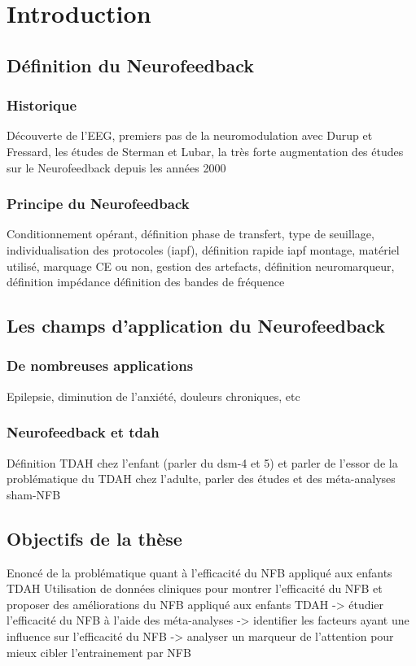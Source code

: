 \chapter{Introduction}


\section{Définition du Neurofeedback}

\subsection{Historique}
Découverte de l’EEG, premiers pas de la neuromodulation avec Durup 
et Fressard, les études de Sterman et Lubar, la très forte augmentation des études sur le Neurofeedback depuis 
les années 2000

\subsection{Principe du Neurofeedback}
Conditionnement opérant, définition phase de transfert, type de seuillage, individualisation des protocoles (iapf), 
définition rapide iapf
montage, matériel utilisé, marquage CE ou non, gestion des artefacts, définition neuromarqueur, définition impédance
définition des bandes de fréquence

\section{Les champs d'application du Neurofeedback}

\subsection{De nombreuses applications}
Epilepsie, diminution de l’anxiété, douleurs chroniques, etc

\subsection{Neurofeedback et \gls{tdah}}
Définition TDAH chez l’enfant (parler du dsm-4 et 5) et parler de l’essor de la problématique du TDAH chez l’adulte, parler des études et des méta-analyses
sham-NFB

\section{Objectifs de la thèse}
Enoncé de la problématique quant à l’efficacité du NFB appliqué aux enfants TDAH
Utilisation de données cliniques pour montrer l'efficacité du NFB et proposer des améliorations du NFB appliqué aux enfants TDAH
-> étudier l'efficacité du NFB à l'aide des méta-analyses
-> identifier les facteurs ayant une influence sur l'efficacité du NFB
-> analyser un marqueur de l'attention pour mieux cibler l'entrainement par NFB

